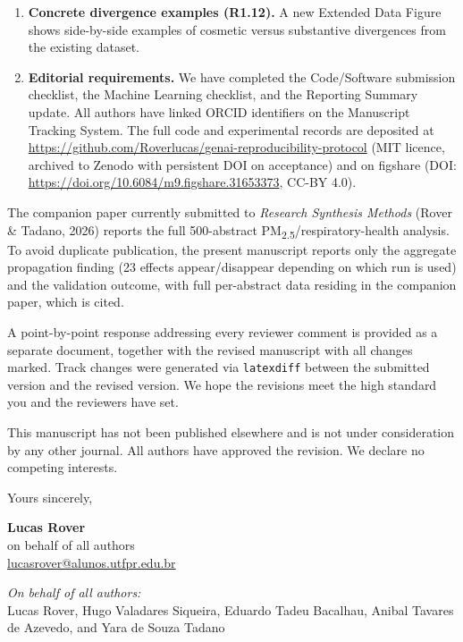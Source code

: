 \documentclass[11pt,a4paper]{article}
\begin{document}
\begin{enumerate}
  \item \textbf{Concrete divergence examples (R1.12).} A new Extended Data Figure shows side-by-side examples of cosmetic versus substantive divergences from the existing dataset.

  \item \textbf{Editorial requirements.} We have completed the Code/Software submission checklist, the Machine Learning checklist, and the Reporting Summary update. All authors have linked ORCID identifiers on the Manuscript Tracking System. The full code and experimental records are deposited at \url{https://github.com/Roverlucas/genai-reproducibility-protocol} (MIT licence, archived to Zenodo with persistent DOI on acceptance) and on figshare (DOI: \url{https://doi.org/10.6084/m9.figshare.31653373}, CC-BY 4.0).
\end{enumerate}

The companion paper currently submitted to \emph{Research Synthesis Methods} (Rover \& Tadano, 2026) reports the full 500-abstract PM\textsubscript{2.5}/respiratory-health analysis. To avoid duplicate publication, the present manuscript reports only the aggregate propagation finding (23 effects appear/disappear depending on which run is used) and the validation outcome, with full per-abstract data residing in the companion paper, which is cited.

A point-by-point response addressing every reviewer comment is provided as a separate document, together with the revised manuscript with all changes marked. Track changes were generated via \texttt{latexdiff} between the submitted version and the revised version. We hope the revisions meet the high standard you and the reviewers have set.

This manuscript has not been published elsewhere and is not under consideration by any other journal. All authors have approved the revision. We declare no competing interests.

\bigskip

\noindent Yours sincerely,

\bigskip\bigskip

\noindent \textbf{Lucas Rover}\\
on behalf of all authors\\
\href{mailto:lucasrover@alunos.utfpr.edu.br}{lucasrover@alunos.utfpr.edu.br}\\

\bigskip

\noindent \textit{On behalf of all authors:}\\
Lucas Rover, Hugo Valadares Siqueira, Eduardo Tadeu Bacalhau, Anibal Tavares de Azevedo, and Yara de Souza Tadano
\end{document}
